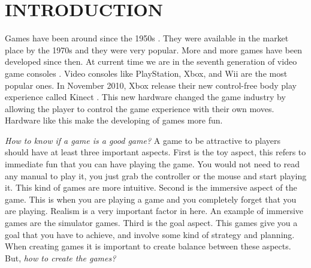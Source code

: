 \chapter{INTRODUCTION}








Games have been around since the 1950s \cite{computerVideoGamesHistory}. They were available in the market place by the 1970s and they were very popular. More and more games have been developed since then. At current time we are in the seventh generation of video game consoles \cite{seventhGenerationGames}. Video consoles like PlayStation, Xbox, and Wii are the most popular ones. In November 2010, Xbox release their new control-free body play experience called Kinect \cite{kinect}. This new hardware changed the game industry by allowing the player to control the game experience with their own moves. Hardware like this make the developing of games more fun. 

\textit{How to know if a game is a good game?} A game to be attractive to players should have at least three important aspects\cite{bookGameKit2}. First is the toy aspect, this refers to immediate fun that you can have playing the game. You would not need to read any manual to play it, you just grab the controller or the mouse and start playing it. This kind of games are more intuitive. Second is the immersive aspect of the game. This is when you are playing a game and you completely forget that you are playing. Realism is a very important factor in here. An example of immersive games are the simulator games. Third is the goal aspect. This games give you a goal that you have to achieve, and involve some kind of strategy and planning. When creating games it is important to create balance between these aspects. But, \textit{how to create the games?}

